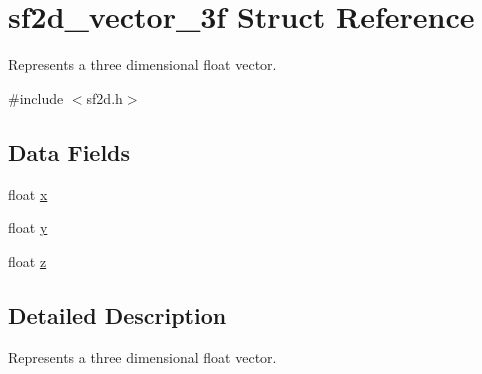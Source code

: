 \hypertarget{structsf2d__vector__3f}{\section{sf2d\-\_\-vector\-\_\-3f Struct Reference}
\label{structsf2d__vector__3f}
}


Represents a three dimensional float vector.  




{\ttfamily \#include $<$sf2d.\-h$>$}

\subsection*{Data Fields}
\begin{DoxyCompactItemize}
\item 
float \hyperlink{structsf2d__vector__3f_acfe35bcf39de79f3edd634ad1bce3d74}{x}
\item 
float \hyperlink{structsf2d__vector__3f_ac7f2e5651290011f9c1fbe017dec219e}{y}
\item 
float \hyperlink{structsf2d__vector__3f_ab8ae4e1b464f00ac0d6dc3714f94ac18}{z}
\end{DoxyCompactItemize}


\subsection{Detailed Description}
Represents a three dimensional float vector. 

